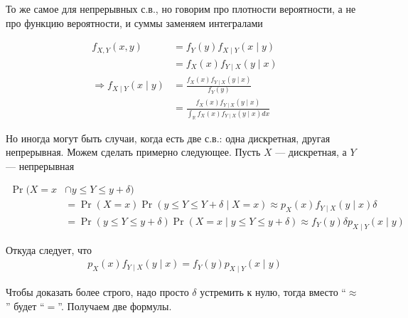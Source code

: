 \documentclass[12pt]{article}
\newcommand\R{\mathbb{R}}
\begin{document}
То же самое для непрерывных с.в., но говорим про плотности вероятности, а не про функцию вероятности, и суммы заменяем интегралами

\begin{align*}
  f_{X, Y}(x, y) &= f_Y(y) f_{X \mid Y}(x \mid y) \\
                 &= f_X(x) f_{Y \mid X}(y \mid x) \\
 \Rightarrow 
 f_{X \mid Y}(x \mid y) &= \frac{f_X(x) f_{Y \mid X}(y \mid x)}{f_Y(y)} \\
                        &= \frac{f_X(x) f_{Y \mid X}(y \mid x)}{\int_{\R} f_X(x) f_{Y \mid X}(y \mid x) dx}
\end{align*}

\begin{center}
\end{center}

Но иногда могут быть случаи, когда есть две с.в.: одна дискретная, другая непрерывная. Можем сделать примерно следующее. Пусть $X$ --- дискретная, а $Y$ --- непрерывная

\begin{align*}
  \Pr(X = x &\cap y \le Y \le y + \delta) \\
  &= \Pr(X = x) \Pr (y \le Y \le Y + \delta \mid X = x) \approx p_X(x) f_{Y \mid X}(y \mid x) \delta \\
  &= \Pr(y \le Y \le y + \delta) \Pr(X = x \mid y \le Y \le y + \delta) \approx f_Y(y) \delta p_{X \mid Y}(x \mid y)
\end{align*}

Откуда следует, что 
\begin{align*}
  p_X(x) f_{Y \mid X}(y \mid x) = f_Y(y) p_{X \mid Y}(x \mid y)
\end{align*}

Чтобы доказать более строго, надо просто $\delta$ устремить к нулю, тогда вместо ``$\approx$'' будет ``$=$''. Получаем две формулы.
\end{document}
